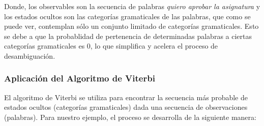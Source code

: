 \documentclass[11pt,openany]{book}
\begin{document}
Donde, los observables son la secuencia de palabras \textit{quiero aprobar la asignatura} y los estados ocultos son las categorías gramaticales de las palabras,
que como se puede ver, contemplan sólo un conjunto limitado de categorías gramaticales. Esto se debe a que 
la probablidad de pertenencia de determinadas palabras a ciertas categorías gramaticales es 0, lo que simplifica
y acelera el proceso de desambiguación.

\subsubsection{Aplicación del Algoritmo de Viterbi}
El algoritmo de Viterbi se utiliza para encontrar la secuencia más probable de estados ocultos (categorías gramaticales) dada una secuencia de observaciones (palabras). Para nuestro ejemplo, el proceso se desarrolla de la siguiente manera:
\end{document}
